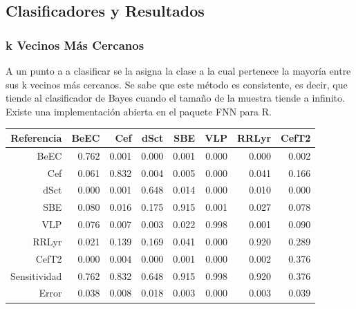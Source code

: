 \documentclass{beamer}
\begin{document}
\subsection{Clasificadores y Resultados}
\begin{frame}%
  \frametitle{k Vecinos Más Cercanos}
A un punto a a clasificar se la asigna la clase a la cual pertenece la mayoría entre sus k vecinos más cercanos. Se sabe que este método es consistente, es decir, que tiende al clasificador de Bayes cuando el tamaño de la muestra tiende a infinito. Existe una implementación abierta en el paquete FNN para R.

    \begin{table}[ht]
      \centering
  \resizebox{0.7\textwidth}{!} {
      \begin{tabular}{rrrrrrrr}
        \hline
        \hline
        Referencia& BeEC & Cef & dSct & SBE & VLP & RRLyr & CefT2 \\ 
        \hline
        \hline
        BeEC & 0.762 & 0.001 & 0.000 & 0.001 & 0.000 & 0.000 & 0.002 \\ 
        Cef & 0.061 & 0.832 & 0.004 & 0.005 & 0.000 & 0.041 & 0.166 \\ 
        dSct & 0.000 & 0.001 & 0.648 & 0.014 & 0.000 & 0.010 & 0.000 \\ 
        SBE & 0.080 & 0.016 & 0.175 & 0.915 & 0.001 & 0.027 & 0.078 \\ 
        VLP & 0.076 & 0.007 & 0.003 & 0.022 & 0.998 & 0.001 & 0.090 \\ 
        RRLyr & 0.021 & 0.139 & 0.169 & 0.041 & 0.000 & 0.920 & 0.289 \\ 
        CefT2 & 0.000 & 0.004 & 0.000 & 0.001 & 0.000 & 0.002 & 0.376 \\ 
        \hline
        \hline
        Sensitividad & 0.762 & 0.832 & 0.648 & 0.915 & 0.998 & 0.920 & 0.376 \\ 
        \hline
        Error & 0.038 & 0.008 & 0.018 & 0.003 & 0.000 & 0.003 & 0.039 \\ 
        \hline
        \hline
      \end{tabular}
    }
    \end{table}
\end{frame}
\end{document}
